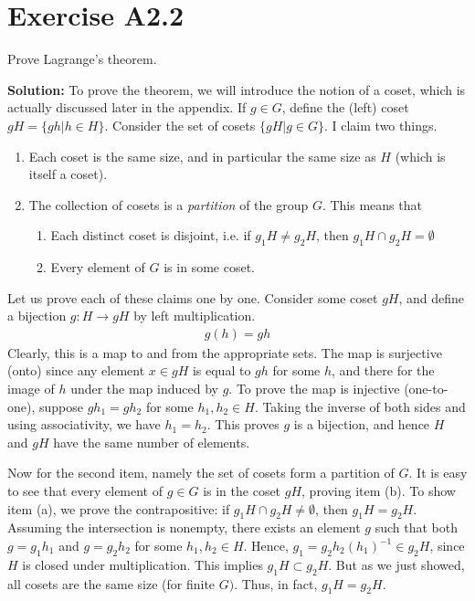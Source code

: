 \documentclass{book}
\begin{document}
\section*{Exercise A2.2}
    Prove Lagrange's theorem.
    
    \textbf{Solution:} To prove the theorem, we will introduce the notion of a coset, which is actually discussed later in the appendix. If $g\in G$, define the (left) coset $gH = \{gh|h\in H\}$. Consider the set of cosets $\{gH| g\in G\}$. I claim two things.
    \begin{enumerate}
        \item Each coset is the same size, and in particular the same size as $H$ (which is itself a coset).
        \item The collection of cosets is a \emph{partition} of the group $G$. This means that
        \begin{enumerate}
            \item Each distinct coset is disjoint, i.e. if $g_1 H \neq g_2 H$, then $g_1 H \cap g_2 H = \emptyset$
            \item Every element of $G$ is in some coset.
        \end{enumerate}
    \end{enumerate}
    Let us prove each of these claims one by one. Consider some coset $gH$, and define a bijection $g:H\rightarrow gH$ by left multiplication.
    \begin{align}
        g(h) = gh
    \end{align}
    Clearly, this is a map to and from the appropriate sets. The map is surjective (onto) since any element $x\in gH$ is equal to $gh$ for some $h$, and there for the image of $h$ under the map induced by $g$. To prove the map is injective (one-to-one), suppose $gh_1 = gh_2$ for some $h_1, h_2 \in H$. Taking the inverse of both sides and using associativity, we have $h_1 = h_2$. This proves $g$ is a bijection, and hence $H$ and $gH$ have the same number of elements. 
    
    Now for the second item, namely the set of cosets form a partition of $G$. It is easy to see that every element of $g\in G$ is in the coset $gH$, proving item (b). To show item (a), we prove the contrapositive: if $g_1 H\cap g_2 H \neq \emptyset$, then $g_1 H = g_2 H$. Assuming the intersection is nonempty, there exists an element $g$ such that both $g = g_1 h_1$ and $g = g_2 h_2$ for some $h_1, h_2 \in H$. Hence, $g_1 = g_2 h_2 (h_1)^{-1} \in g_2 H$, since $H$ is closed under multiplication. This implies $g_1 H \subset g_2 H$. But as we just showed, all cosets are the same size (for finite $G)$. Thus, in fact, $g_1 H = g_2 H$.
    
\end{document}
